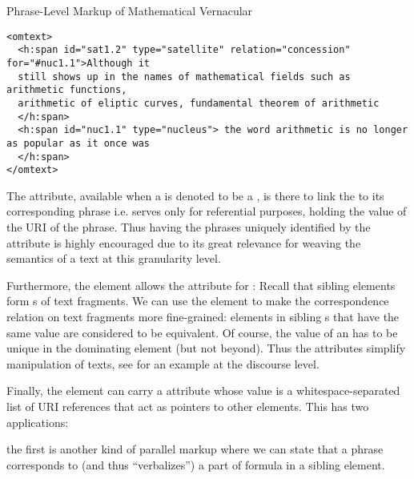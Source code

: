 \begin{module}[id=mtext]
\begin{omgroup}[id=mtext,short=Mathematical Text]
\begin{omgroup}[id=phrases]{Phrase-Level Markup of Mathematical Vernacular}
\begin{lstlisting}[label=lst:phrase-type-attribute, caption= Phrases and their attribute 
usage, index={h:span}]
<omtext>
  <h:span id="sat1.2" type="satellite" relation="concession" for="#nuc1.1">Although it 
  still shows up in the names of mathematical fields such as arithmetic functions, 
  arithmetic of eliptic curves, fundamental theorem of arithmetic
  </h:span>
  <h:span id="nuc1.1" type="nucleus"> the word arithmetic is no longer as popular as it once was
  </h:span>
</omtext>
\end{lstlisting}

  The {} attribute, available when a {} is denoted to be a 
  {}, is there to link the {} to its 
  corresponding {} phrase i.e. serves only for referential 
  purposes, holding the value of the URI of the {} phrase. 
  Thus having the phrases uniquely identified by the {} 
  attribute is highly encouraged due to its great relevance for weaving the semantics of 
  a text at this granularity level.

  Furthermore, the {} element allows the attribute
  {} for
  {}: Recall that sibling
  {} elements form {s} of text fragments.  We
  can use the {} element to make the correspondence relation on
  text fragments more fine-grained: {} elements in sibling
  {s} that have the same {} value are
  considered to be equivalent.  Of course, the value of an
  {} has to be unique in the dominating {}
  element (but not beyond). Thus the {} attributes
  simplify manipulation of {} texts, see
  {} for an example at the discourse level.

  Finally, the {} element can carry a {}
  attribute whose value is a whitespace-separated list of URI references that act as
  pointers to other {\omdoc} elements. This has two applications: 
  \begin{example}[display=flow] the first is another kind of parallel markup where we can
    state that a phrase corresponds to (and thus ``verbalizes'') a part of formula in a
    sibling {} element.


\end{example}
\end{omgroup}
\end{omgroup}
\end{module}
